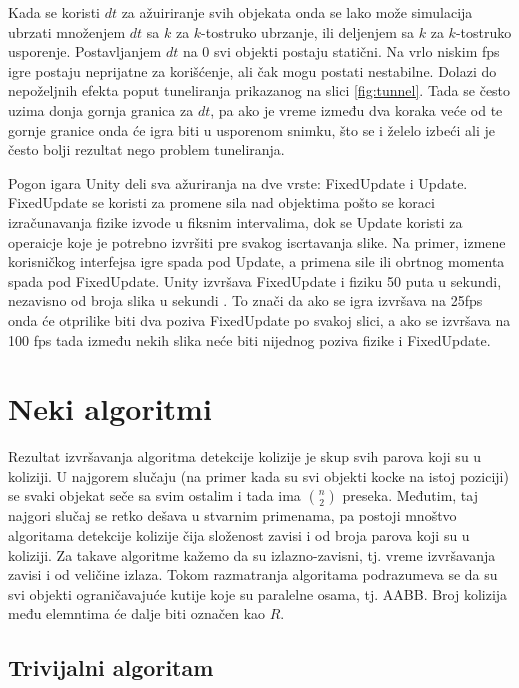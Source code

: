 \documentclass{article}
\begin{document}
{Kada se koristi $dt$ za ažuiriranje svih objekata onda se lako može simulacija ubrzati množenjem $dt$ 
sa $k$ za $k$-tostruko ubrzanje, ili deljenjem sa $k$ za $k$-tostruko usporenje. Postavljanjem $dt$ na 0 svi 
objekti postaju statični. 
Na vrlo niskim fps igre postaju neprijatne za korišćenje, ali čak mogu postati nestabilne. Dolazi do nepoželjnih efekta 
poput tuneliranja prikazanog na slici \ref{fig:tunnel}. Tada se često uzima donja gornja granica za $dt$, pa 
ako je vreme između dva koraka veće od te gornje granice onda će igra biti u usporenom snimku, što se i želelo izbeći 
ali je često bolji rezultat nego problem tuneliranja.

Pogon igara Unity deli sva ažuriranja na dve vrste: FixedUpdate i Update. 
FixedUpdate se koristi za promene sila nad objektima pošto se koraci izračunavanja fizike izvode u fiksnim intervalima, 
dok se Update koristi za operaicje koje je potrebno izvršiti pre svakog iscrtavanja slike. 
Na primer, izmene korisničkog interfejsa igre spada pod Update, a primena sile ili obrtnog momenta spada pod FixedUpdate.
Unity izvršava FixedUpdate i fiziku 50 puta u sekundi, nezavisno od broja slika u sekundi \cite{unity}.
To znači da ako se igra izvršava na 25fps onda će otprilike biti dva poziva FixedUpdate po svakoj slici,
a ako se izvršava na 100 fps tada između nekih slika neće biti nijednog poziva fizike i FixedUpdate.


\section{Neki algoritmi}
\label{sec:algoritmi}

Rezultat izvršavanja algoritma detekcije kolizije je skup svih parova koji su u koliziji.
U najgorem slučaju (na primer kada su svi objekti kocke na istoj poziciji) se svaki objekat
seče sa svim ostalim i tada ima $ {n\choose 2}  $ preseka. Međutim, taj najgori slučaj se retko dešava
u stvarnim primenama, pa postoji mnoštvo algoritama detekcije kolizije čija složenost zavisi i od broja
parova koji su u koliziji. Za takave algoritme kažemo da su izlazno-zavisni, tj.
vreme izvršavanja zavisi i od veličine izlaza. Tokom razmatranja algoritama podrazumeva se da su svi
objekti ograničavajuće kutije koje su paralelne osama, tj. AABB.
Broj kolizija među elemntima će dalje biti označen kao $R$. 

\subsection{Trivijalni algoritam}
\label{subsec:triv}

}
\end{document}
